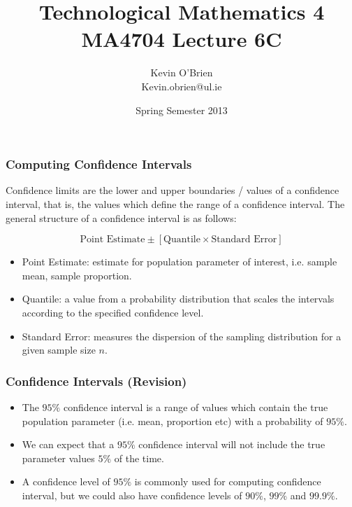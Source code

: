 \documentclass[a4]{beamer}
\title[MA4704]{Technological Mathematics 4 \\ {\normalsize MA4704 Lecture 6C}}
\author[Kevin O'Brien]{Kevin O'Brien \\ {\scriptsize Kevin.obrien@ul.ie}}
\date{Spring Semester 2013}
\institute[Maths \& Stats]{Dept. of Mathematics \& Statistics, \\ University \textit{of} Limerick}
\begin{document}
\begin{frame}
\titlepage
\end{frame}




\begin{frame}
\frametitle{Computing Confidence Intervals}
Confidence limits are the lower and upper boundaries / values of a confidence interval, that is, the values which define the range of a confidence interval. The general structure of a confidence interval is as follows:

\[ \mbox{Point Estimate}  \pm \left[ \mbox{Quantile} \times \mbox{Standard Error} \right] \]


\begin{itemize}
\item Point Estimate: estimate for population parameter of interest, i.e. sample mean, sample proportion.
\item Quantile: a value from a probability distribution that scales the intervals according to the specified confidence level.
\item Standard Error: measures the dispersion of the sampling distribution for a given sample size $n$.
\end{itemize}
\end{frame}





\begin{frame}
\frametitle{Confidence Intervals (Revision) }

\begin{itemize}
\item The $95\%$ confidence interval is a range of values which contain the true population parameter (i.e. mean, proportion etc) with a probability of $95\%$.
\item We can expect that a $95\%$ confidence interval will not include the true parameter values $5\%$ of the time.
\item A confidence level of $95\%$ is commonly used for computing confidence interval, but we could also have confidence levels of $90\%$, $99\%$ and $99.9\%$.
\end{itemize}

\end{frame}
\end{document}
